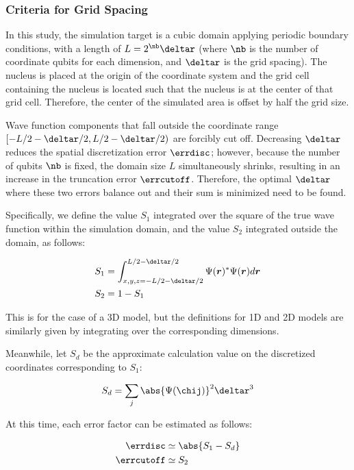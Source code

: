 \documentclass[manuscript_main.tex]{subfiles}
\begin{document}
\subsubsection{Criteria for Grid Spacing}
\label{subsec:criteria-for-grid-spacing}

In this study, the simulation target is a cubic domain applying periodic
boundary conditions, with a length of $L=2^{\nb}\deltar$ (where $\nb$ is the
number of coordinate qubits for each dimension, and $\deltar$ is the grid
spacing). The nucleus is placed at the origin of the coordinate system and the
grid cell containing the nucleus is located such that the nucleus is at the
center of that grid cell. Therefore, the center of the simulated area is offset
by half the grid size.

Wave function components that fall outside the coordinate range
$[-L/2-\deltar/2, L/2-\deltar/2)$ are forcibly cut off. Decreasing $\deltar$
reduces the spatial discretization error $\errdisc$; however, because the number
of qubits $\nb$ is fixed, the domain size $L$ simultaneously shrinks, resulting
in an increase in the truncation error $\errcutoff$. Therefore, the optimal
$\deltar$ where these two errors balance out and their sum is minimized need to
be found.

Specifically, we define the value $S_1$ integrated over the square of the true
wave function within the simulation domain, and the value $S_2$ integrated
outside the domain, as follows:

\begin{align}
S_1 &= \int_{x,y,z=-L/2-\deltar/2}^{L/2-\deltar/2}\Psi(\bm{r})^{\ast}\Psi(\bm{r}) d\bm{r} \\
S_2 &= 1 - S_1
\end{align}

This is for the case of a 3D model, but the definitions for 1D and 2D models are
similarly given by integrating over the corresponding dimensions.

Meanwhile, let $S_d$ be the approximate calculation value on the discretized
coordinates corresponding to $S_1$:

\begin{equation}
S_d = \sum_{j}\abs{\Psi(\chij)}^2 \deltar^3
\end{equation}

At this time, each error factor can be estimated as follows:

\begin{align}
\errdisc &\simeq \abs{S_1 - S_d} \label{eq:err-disc-definition}\\
\errcutoff &\simeq S_2 \label{eq:err-cutoff-definition}
\end{align}
\end{document}
